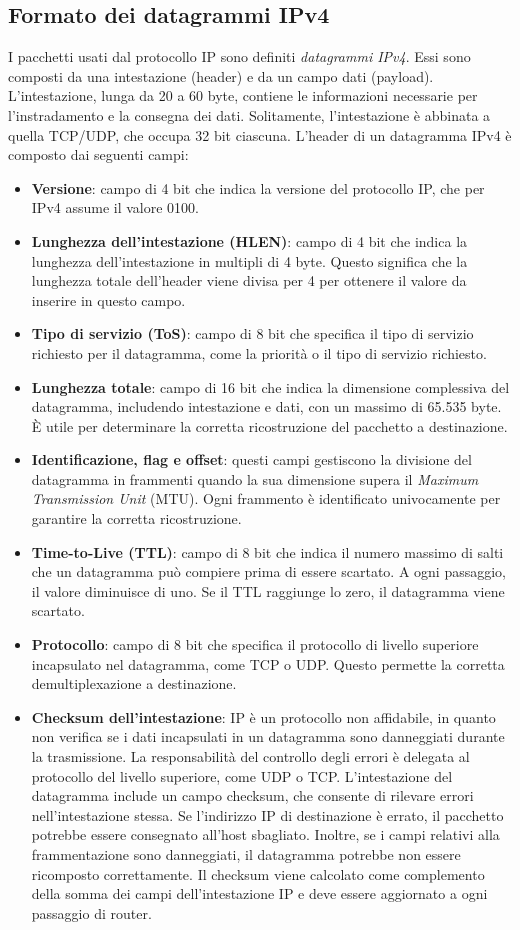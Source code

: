 \documentclass[12pt]{report}
\begin{document}
\subsection{Formato dei datagrammi IPv4}
I pacchetti usati dal protocollo IP sono definiti \textit{datagrammi IPv4}. Essi sono composti da una intestazione (header) e da un campo dati (payload). L’intestazione, lunga da 20 a 60 byte, contiene le informazioni necessarie per l’instradamento e la consegna dei dati. Solitamente, l’intestazione è abbinata a quella TCP/UDP, che occupa 32 bit ciascuna. L'header di un datagramma IPv4 è composto dai seguenti campi:
\begin{itemize}
	\item \textbf{Versione}: campo di 4 bit che indica la versione del protocollo IP, che per IPv4 assume il valore 0100.
	\item \textbf{Lunghezza dell'intestazione (HLEN)}: campo di 4 bit che indica la lunghezza dell'intestazione in multipli di 4 byte. Questo significa che la lunghezza totale dell'header viene divisa per 4 per ottenere il valore da inserire in questo campo.
	\item \textbf{Tipo di servizio (ToS)}: campo di 8 bit che specifica il tipo di servizio richiesto per il datagramma, come la priorità o il tipo di servizio richiesto.
	\item \textbf{Lunghezza totale}: campo di 16 bit che indica la dimensione complessiva del datagramma, includendo intestazione e dati, con un massimo di 65.535 byte. È utile per determinare la corretta ricostruzione del pacchetto a destinazione.
	\item \textbf{Identificazione, flag e offset}: questi campi gestiscono la divisione del datagramma in frammenti quando la sua dimensione supera il \textit{Maximum Transmission Unit} (MTU). Ogni frammento è identificato univocamente per garantire la corretta ricostruzione.
	\item \textbf{Time-to-Live (TTL)}: campo di 8 bit che indica il numero massimo di salti che un datagramma può compiere prima di essere scartato. A ogni passaggio, il valore diminuisce di uno. Se il TTL raggiunge lo zero, il datagramma viene scartato.
	\item \textbf{Protocollo}: campo di 8 bit che specifica il protocollo di livello superiore incapsulato nel datagramma, come TCP o UDP. Questo permette la corretta demultiplexazione a destinazione.
	\item \textbf{Checksum dell'intestazione}: IP è un protocollo non affidabile, in quanto non verifica se i dati incapsulati in un datagramma sono danneggiati durante la trasmissione. La responsabilità del controllo degli errori è delegata al protocollo del livello superiore, come UDP o TCP. L'intestazione del datagramma include un campo checksum, che consente di rilevare errori nell'intestazione stessa. Se l'indirizzo IP di destinazione è errato, il pacchetto potrebbe essere consegnato all'host sbagliato. Inoltre, se i campi relativi alla frammentazione sono danneggiati, il datagramma potrebbe non essere ricomposto correttamente. Il checksum viene calcolato come complemento della somma dei campi dell'intestazione IP e deve essere aggiornato a ogni passaggio di router.

\end{itemize}
\end{document}
